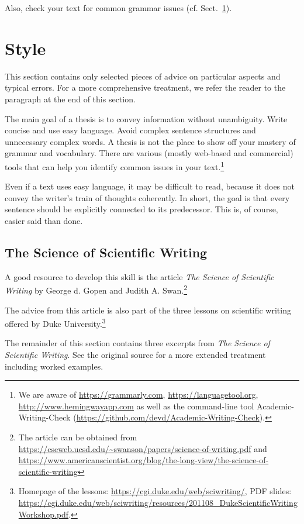 Also, check your text for common grammar issues (cf. Sect.~\ref{sec:style}).

\section{Style}
\label{sec:style}

This section contains only selected pieces of advice on particular aspects and typical errors. For a more comprehensive treatment, we refer the reader to the paragraph  at the end of this section.

The main goal of a thesis is to convey information without unambiguity. Write concise and use easy language. Avoid complex sentence structures and unnecessary complex words. A thesis is not the place to show off your mastery of grammar and vocabulary. There are various (mostly web-based and commercial) tools that can help you identify common issues in your text.\footnote{We are aware of \url{https://grammarly.com}, \url{https://languagetool.org}, \url{http://www.hemingwayapp.com} as well as the command-line tool Academic-Writing-Check (\url{https://github.com/devd/Academic-Writing-Check}).}

Even if a text uses easy language, it may be difficult to read, because it does not convey the writer's train of thoughts coherently. In short, the goal is that every sentence should be explicitly connected to its predecessor. This is, of course, easier said than done.

\subsection{The Science of Scientific Writing}

A good resource to develop this skill is the article \emph{The Science of Scientific Writing} by George d. Gopen and Judith A. Swan.\footnote{The article can be obtained from \url{https://cseweb.ucsd.edu/~swanson/papers/science-of-writing.pdf} and \url{https://www.americanscientist.org/blog/the-long-view/the-science-of-scientific-writing}} 

The advice from this article is also part of the three lessons on scientific writing offered by Duke University.\footnote{Homepage of the lessons: \url{https://cgi.duke.edu/web/sciwriting/}, PDF slides: \url{https://cgi.duke.edu/web/sciwriting/resources/201108_DukeScientificWritingWorkshop.pdf}.}

The remainder of this section contains three excerpts from \emph{The Science of Scientific Writing}. See the original source for a more extended treatment including worked examples.

